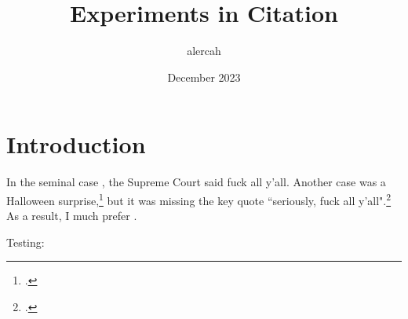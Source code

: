 \documentclass{article}
\title{Experiments in Citation}
\author{alercah}
\date{December 2023}
\begin{document}
\maketitle

\section{Introduction}

In the seminal case \textcite{oakes}, the Supreme Court said fuck all y'all. Another case was a Halloween surprise,\footcite{sauvé} but it was missing the key quote ``seriously, fuck all y'all".\footcite{oakes} As a result, I much prefer \textcite{oakes}.

Testing: \cite{oakes} \cite{oakes}  

\printbibliography[filter=mcgill]
\end{document}

